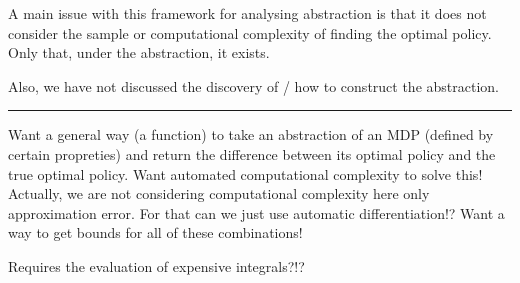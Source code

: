 A main issue with this framework for analysing abstraction is that it does not consider
the sample or computational complexity of finding the optimal policy. Only that, under the abstraction,
it exists.

Also, we have not discussed the discovery of / how to construct the abstraction.

\begin{center}\rule{0.5\linewidth}{\linethickness}\end{center}

Want a general way (a function) to take an abstraction of an MDP
(defined by certain propreties) and return the difference between its
optimal policy and the true optimal policy. Want automated computational
complexity to solve this! Actually, we are not considering computational
complexity here only approximation error. For that can we just use
automatic differentiation!? Want a way to get bounds for all of these
combinations!

Requires the evaluation of expensive integrals?!?
